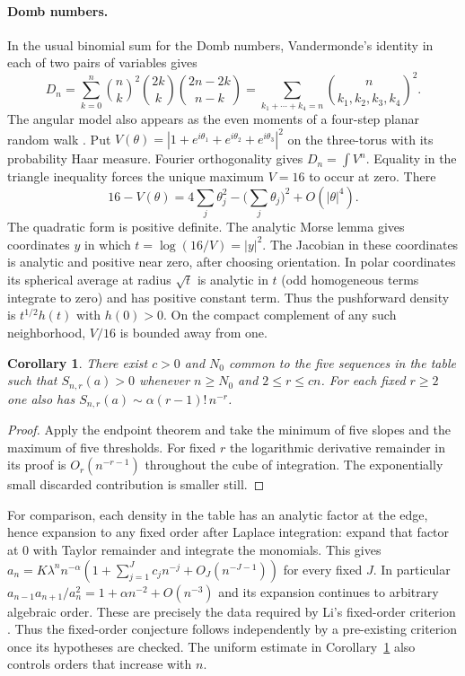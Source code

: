 \documentclass[11pt,a4paper]{article}
\newtheorem{corollary}[theorem]{Corollary}
\begin{document}
\paragraph{Domb numbers.}
In the usual binomial sum for the Domb numbers, Vandermonde's identity
in each of two pairs of variables gives
\[
 D_n=\sum_{k=0}^n\binom nk^2\binom{2k}{k}\binom{2n-2k}{n-k}
 =\!\sum_{k_1+\cdots+k_4=n}\!\binom{n}{k_1,k_2,k_3,k_4}^{\!2}.
\]
The angular model also appears as the even moments of a four-step planar
random walk \cite[Example~3.17]{walk}. Put
$V(\theta)=|1+e^{i\theta_1}+e^{i\theta_2}+e^{i\theta_3}|^2$
on the three-torus with its probability Haar measure.
Fourier orthogonality gives $D_n=\int V^n$.
Equality in the triangle inequality forces the unique maximum $V=16$
to occur at zero. There
\[
 16-V(\theta)=4\sum_j\theta_j^2-\Big(\sum_j\theta_j\Big)^2
                +O(|\theta|^4).
\]
The quadratic form is positive definite. The analytic Morse lemma gives
coordinates $y$ in which $t=\log(16/V)=|y|^2$.
The Jacobian in these coordinates is analytic and positive near zero,
after choosing orientation. In polar coordinates its spherical average
at radius $\sqrt t$ is analytic in $t$ (odd homogeneous terms integrate
to zero) and has positive constant term. Thus the pushforward density
is $t^{1/2}h(t)$ with $h(0)>0$. On the compact complement of any such
neighborhood, $V/16$ is bounded away from one.

\begin{corollary}\label{cor:five}
There exist $c>0$ and $N_0$ common to the five sequences in the table
such that $S_{n,r}(a)>0$ whenever $n\ge N_0$ and $2\le r\le cn$.
For each fixed $r\ge2$ one also has
$S_{n,r}(a)\sim\alpha(r-1)!\,n^{-r}$.
\end{corollary}
\begin{proof}
Apply the endpoint theorem and take the minimum of five slopes and
the maximum of five thresholds. For fixed $r$ the logarithmic derivative
remainder in its proof is $O_r(n^{-r-1})$ throughout the cube of
integration. The exponentially small discarded contribution is smaller
still.
\end{proof}

For comparison, each density in the table has an analytic factor at the
edge, hence expansion to any fixed order after Laplace integration:
expand that factor at $0$ with Taylor remainder and integrate the monomials.
This gives $a_n=K\lambda^n n^{-\alpha}(1+\sum_{j=1}^J c_j n^{-j}
+O_J(n^{-J-1}))$ for every fixed $J$. In particular
$a_{n-1}a_{n+1}/a_n^2=1+\alpha n^{-2}+O(n^{-3})$ and its expansion
continues to arbitrary algebraic order. These are precisely the data
required by Li's fixed-order criterion \cite[Thm.~2.2]{li}. Thus the
fixed-order conjecture follows independently by a pre-existing
criterion once its hypotheses are checked. The uniform estimate in
Corollary~\ref{cor:five} also controls orders that increase with $n$.
\end{document}
